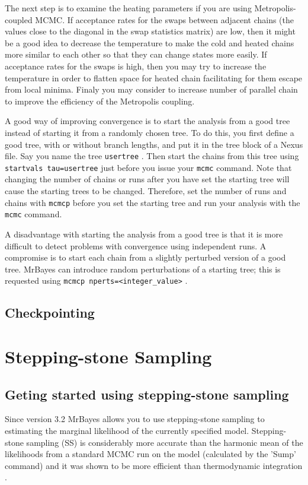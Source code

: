 \documentclass[12pt]{book}
\newcommand{\ttt}[1]{\texttt{#1} }
\begin{document}
The next step is to examine the heating parameters if you are using Metropolis-coupled
MCMC. If acceptance rates for the swaps between adjacent chains (the values close to
the diagonal in the swap statistics matrix) are low, then it might be a good idea to
decrease the temperature to make the cold and heated chains more similar to each other
so that they can change states more easily. If acceptance rates for the swaps is high,
then you may try to increase the temperature in order to flatten space for heated chain
facilitating for them escape from local minima. Finaly you may consider to increase
number of parallel chain to improve the efficiency of the Metropolis coupling.

A good way of improving convergence is to start the analysis from a good tree instead of
starting it from a randomly chosen tree. To do this, you first define a good tree, with or
without branch lengths, and put it in the tree block of a Nexus file. Say you name the
tree \ttt{usertree}. Then start the chains from this tree using \ttt{startvals tau=usertree} just
before you issue your \ttt{mcmc} command. Note that changing the number of chains or runs
after you have set the starting tree will cause the starting trees to be changed. Therefore,
set the number of runs and chains with \ttt{mcmcp} before you set the starting tree and
run your analysis with the \ttt{mcmc} command.

A disadvantage with starting the analysis from a good tree is that it is more difficult to detect
problems with convergence using independent runs. A compromise is to start each chain from
a slightly perturbed version of a good tree. MrBayes can introduce random perturbations of a
starting tree; this is requested using \ttt{mcmcp nperts=<integer\_value>}.

\subsection{Checkpointing}


\section{Stepping-stone Sampling}


\subsection{Geting started using stepping-stone sampling}
  Since version 3.2 MrBayes allows you to use stepping-stone sampling \citep{xie11} to estimating the marginal likelihood of the
  currently specified model. Stepping-stone sampling (SS) is considerably more accurate than the harmonic mean of the likelihoods
  from a standard MCMC run on the model (calculated by the 'Sump' command) and it was shown to be more efficient than
  thermodynamic integration \citep{xie11}. 
\end{document}
